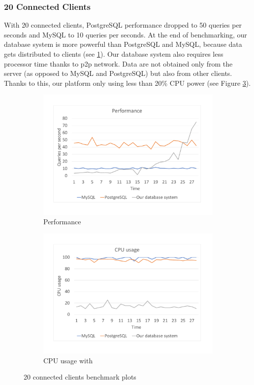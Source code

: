 \subsubsection*{20 Connected Clients}
With 20 connected clients, PostgreSQL performance dropped to 50 queries per seconds and MySQL to 10 queries per seconds. At the end of benchmarking, our database system is more powerful than PostgreSQL and MySQL, because data gets distributed to clients (see \ref{bench20per}). Our database system also requires less processor time thanks to p2p network. Data are not obtained only from the server (as opposed to MySQL and PostgreSQL) but also from other clients. Thanks to this, our platform only using less than 20\% CPU power (see Figure \ref{bench20cpu}).

\begin{figure}[h]
    \begin{subfigure}{.5\textwidth}
        \centering
        \includegraphics[trim={1.78cm 2cm 2.08cm 1cm},clip,width=1.0\linewidth]{excel/20per.pdf}
        \caption{Performance}
        \label{bench20per}
    \end{subfigure}
    \begin{subfigure}{.5\textwidth}
        \centering
        \includegraphics[trim={1.78cm 2cm 2.08cm 1cm},clip,width=1.0\linewidth]{excel/20cpu.pdf}
        \caption{CPU usage with}
        \label{bench20cpu}
    \end{subfigure}
    \caption{20 connected clients benchmark plots}
\end{figure}


